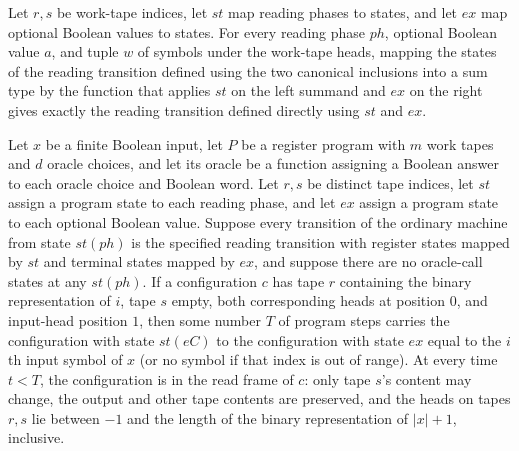 \begin{theorem}
\label{Complexity.LogProg.read_action_map}
\leanok
{}
Let $r,s$ be work-tape indices, let $st$ map reading phases to states, and let $ex$ map
optional Boolean values to states. For every reading phase $ph$, optional Boolean value
$a$, and tuple $w$ of symbols under the work-tape heads, mapping the states of the
reading transition defined using the two canonical inclusions into a sum type by the
function that applies $st$ on the left summand and $ex$ on the right gives exactly the
reading transition defined directly using $st$ and $ex$.
\end{theorem}

\begin{theorem}
\label{Complexity.LogProg.readIn_run}
\leanok
{}
Let $x$ be a finite Boolean input, let $P$ be a register program with $m$ work tapes and
$d$ oracle choices, and let its oracle be a function assigning a Boolean answer to each
oracle choice and Boolean word. Let $r,s$ be distinct tape indices, let $st$ assign a
program state to each reading phase, and let $ex$ assign a program state to each
optional Boolean value. Suppose every transition of the ordinary machine from state
$st(ph)$ is the specified reading transition with register states mapped by $st$ and
terminal states mapped by $ex$, and suppose there are no oracle-call states at any
$st(ph)$. If a configuration $c$ has tape $r$ containing the binary representation of
$i$, tape $s$ empty, both corresponding heads at position $0$, and input-head position
$1$, then some number $T$ of program steps carries the configuration with state $st(eC)$
to the configuration with state $ex$ equal to the $i$th input symbol of $x$ (or no
symbol if that index is out of range). At every time $t<T$, the configuration is in the
read frame of $c$: only tape $s$'s content may change, the output and other tape
contents are preserved, and the heads on tapes $r,s$ lie between $-1$ and the length of
the binary representation of $|x|+1$, inclusive.
\end{theorem}

